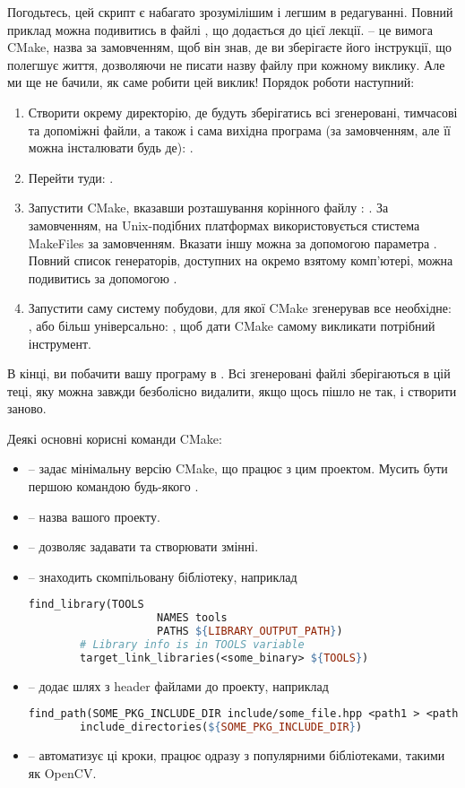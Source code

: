 \documentclass[12pt]{article}
\begin{document}
	Погодьтесь, цей скрипт є набагато зрозумілішим і легшим в редагуванні. Повний приклад можна подивитись в файлі , що додається до цієї лекції.  -- це вимога CMake, назва за замовченням, щоб він знав, де ви зберігаєте його інструкції, що полегшує життя, дозволяючи не писати назву файлу при кожному виклику. Але ми ще не бачили, як саме робити цей виклик! Порядок роботи наступний:
	\begin{enumerate}
		\item Створити окрему директорію, де будуть зберігатись всі згенеровані, тимчасові та допоміжні файли, а також і сама вихідна програма (за замовченням, але її можна інсталювати будь де): .
		\item Перейти туди: .
		\item Запустити CMake, вказавши розташування корінного файлу : . За замовченням, на Unix-подібних платформах використовується стистема MakeFiles за замовченням. Вказати іншу можна за допомогою параметра . Повний список генераторів, доступних на окремо взятому комп'ютері, можна подивитись за допомогою .
		\item Запустити саму систему побудови, для якої CMake згенерував все необхідне: , або більш універсально: , щоб дати CMake самому викликати потрібний інструмент.
	\end{enumerate}

	В кінці, ви побачити вашу програму в . Всі згенеровані файлі зберігаються в цій теці, яку можна завжди безболісно видалити, якщо щось пішло не так, і створити заново.

	Деякі основні корисні команди CMake:
	\begin{itemize}
		\item {} -- задає мінімальну версію CMake, що працює з цим проектом. Мусить бути першою командою будь-якого .
		\item {} -- назва вашого проекту.
		\item {} -- дозволяє задавати та створювати змінні.
		\item {} -- знаходить скомпільовану бібліотеку, наприклад
		\begin{lstlisting}[language=make]
		find_library(TOOLS
					NAMES tools
					PATHS ${LIBRARY_OUTPUT_PATH}) 
		# Library info is in TOOLS variable
		target_link_libraries(<some_binary> ${TOOLS})
		\end{lstlisting}
		\item {} -- додає шлях з header файлами до проекту, наприклад
		\begin{lstlisting}[language=make]
		find_path(SOME_PKG_INCLUDE_DIR include/some_file.hpp <path1 > <path2 > ...)
		include_directories(${SOME_PKG_INCLUDE_DIR})
		\end{lstlisting}
		\item {} -- автоматизує ці кроки, працює одразу з популярними бібліотеками, такими як OpenCV.
	\end{itemize}
	
\end{document}
